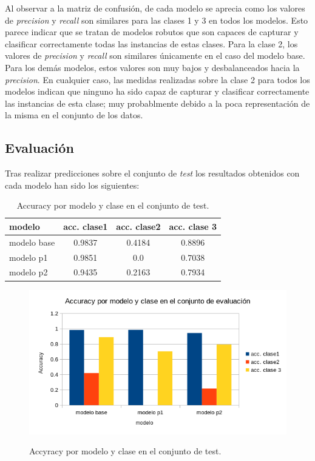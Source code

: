 \documentclass[es]{uc3mreport}
\begin{document}
\begin{report}
Al observar a la matriz de confusión, de cada modelo
se aprecia como los valores de \textit{precision} y \textit{recall} son
similares para las clases 1 y 3 en todos los modelos. Esto parece indicar que se
tratan de modelos robutos que son capaces de capturar y clasificar correctamente
todas las instancias de estas clases. Para la clase 2, los valores de \textit{precision} y \textit{recall} son
similares únicamente en el caso del modelo base. Para los demás modelos, estos
valores son muy bajos y desbalanceados hacia la \textit{precision}. En cualquier
caso, las medidas realizadas sobre la clase 2 para todos los modelos indican que
ninguno ha sido capaz de capturar y clasificar correctamente las instancias de
esta clase; muy probablmente debido a la poca representación de la misma en el
conjunto de los datos.

\subsection{Evaluación}
\label{subsec:comparar_test}

Tras realizar predicciones sobre el conjunto de \textit{test} los resultados
obtenidos con cada modelo han sido los siguientes:

\begin{table}
\begin{tabular}{@{}lccc@{}}
    \toprule
    modelo      & acc. clase1&	acc. clase2	& acc. clase 3 \\
    \midrule     
    modelo base & 0.9837     & 0.4184	& 0.8896 \\
    modelo p1   & 0.9851     & 0.0	    & 0.7038 \\
    modelo p2   & 0.9435     & 0.2163	& 0.7934 \\
    \bottomrule
\end{tabular}
    \caption{Accuracy por modelo y clase en el conjunto de test.}
\end{table}
\begin{figure}[H]
    \center
    \includegraphics[width=0.85\linewidth]{accModClassTest.png}\\
    \caption{Accyracy por modelo y clase en el conjunto de test.}
\end{figure}


\end{report}
\end{document}

